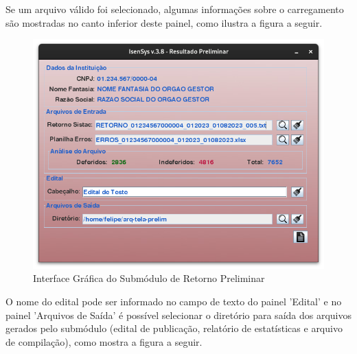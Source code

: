 \documentclass[
	12pt,			%
	openright,		%
	oneside,	
	a4paper,		%
	english,		%
	brazil			%
]{abntex2/abntex2}  %
\begin{document}
	Se um arquivo válido foi selecionado, algumas informações sobre o carregamento são mostradas no canto inferior deste painel, como ilustra a figura a seguir.
	
	\begin{figure}[H]
		\begin{center}
			
			\caption{Interface Gráfica do Submódulo de Retorno Preliminar}
			\label{retorno-prelim-ui-processed}
			
			\includegraphics[scale=0.6]{img/retorno-prelim-ui-processed}
			
		\end{center}
	\end{figure}
	
	O nome do edital pode ser informado no campo de texto do painel 'Edital' e no painel 'Arquivos de Saída' é possível selecionar o diretório para saída dos arquivos gerados pelo submódulo (edital de publicação, relatório de estatísticas e arquivo de compilação), como mostra a figura a seguir.
	
\end{document}
